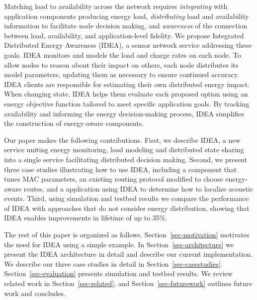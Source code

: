 Matching load to availability across the network requires \emph{integrating}
with application components producing energy load, \emph{distributing}
load and availability information to facilitate node decision making, and
\emph{awareness} of the connection between load, availability, and
application-level fidelity. We propose Integrated Distributed Energy
Awareness (IDEA), a sensor network service addressing these goals. IDEA
monitors and models the load and charge rates on each node.  To allow nodes
to reason about their impact on others, each node distributes its model
parameters, updating them as necessary to ensure continued accuracy.  IDEA
clients are responsible for estimating their own distributed energy
impact. When changing state, IDEA helps them evaluate each
proposed option using an energy objective function tailored to meet
specific application goals. By tracking availability and informing the energy
decision-making process, IDEA simplifies the construction of energy-aware
components.

Our paper makes the following contributions. First, we describe IDEA, a new
service uniting energy monitoring, load modeling and distributed state
sharing into a single service facilitating distributed decision making.
Second, we present three case studies illustrating how to use IDEA, including
a component that tunes MAC parameters, an existing routing protocol modified
to choose energy-aware routes, and a application using IDEA to determine how
to localize acoustic events.  Third, using simulation and testbed results we
compare the performance of IDEA with approaches that do not consider energy
distribution, showing that IDEA enables improvements in lifetime of up to
35\%.

The rest of this paper is organized as follows. Section~\ref{sec-motivation}
motivates the need for IDEA using a simple example. In
Section~\ref{sec-architecture} we present the IDEA architecture in detail and
describe our current implementation. We describe our three case studies in
detail in Section~\ref{sec-casestudies}. Section~\ref{sec-evaluation}
presents simulation and testbed results. We review related work in
Section~\ref{sec-related}, and Section~\ref{sec-futurework} outlines future
work and concludes.
